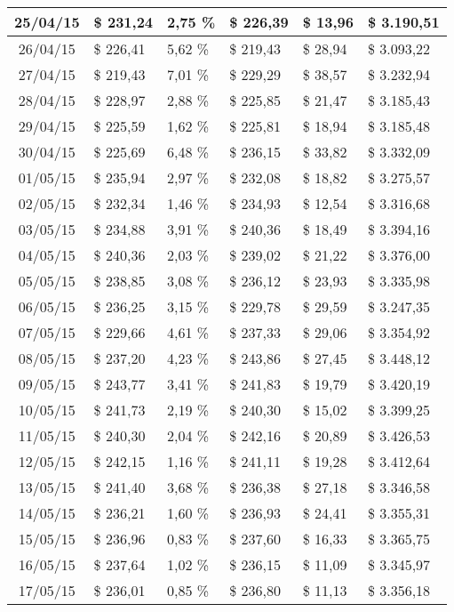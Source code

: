 \begin{small}
\begin{longtable}{|c|l|l|l|l|l|}
25/04/15 & \$ 231,24 & 2,75 \% & \$ 226,39 & \$ 13,96 & \$ 3.190,51 \\ \hline
26/04/15 & \$ 226,41 & 5,62 \% & \$ 219,43 & \$ 28,94 & \$ 3.093,22 \\ \hline
27/04/15 & \$ 219,43 & 7,01 \% & \$ 229,29 & \$ 38,57 & \$ 3.232,94 \\ \hline
28/04/15 & \$ 228,97 & 2,88 \% & \$ 225,85 & \$ 21,47 & \$ 3.185,43 \\ \hline
29/04/15 & \$ 225,59 & 1,62 \% & \$ 225,81 & \$ 18,94 & \$ 3.185,48 \\ \hline
30/04/15 & \$ 225,69 & 6,48 \% & \$ 236,15 & \$ 33,82 & \$ 3.332,09 \\ \hline
01/05/15 & \$ 235,94 & 2,97 \% & \$ 232,08 & \$ 18,82 & \$ 3.275,57 \\ \hline
02/05/15 & \$ 232,34 & 1,46 \% & \$ 234,93 & \$ 12,54 & \$ 3.316,68 \\ \hline
03/05/15 & \$ 234,88 & 3,91 \% & \$ 240,36 & \$ 18,49 & \$ 3.394,16 \\ \hline
04/05/15 & \$ 240,36 & 2,03 \% & \$ 239,02 & \$ 21,22 & \$ 3.376,00 \\ \hline
05/05/15 & \$ 238,85 & 3,08 \% & \$ 236,12 & \$ 23,93 & \$ 3.335,98 \\ \hline
06/05/15 & \$ 236,25 & 3,15 \% & \$ 229,78 & \$ 29,59 & \$ 3.247,35 \\ \hline
07/05/15 & \$ 229,66 & 4,61 \% & \$ 237,33 & \$ 29,06 & \$ 3.354,92 \\ \hline
08/05/15 & \$ 237,20 & 4,23 \% & \$ 243,86 & \$ 27,45 & \$ 3.448,12 \\ \hline
09/05/15 & \$ 243,77 & 3,41 \% & \$ 241,83 & \$ 19,79 & \$ 3.420,19 \\ \hline
10/05/15 & \$ 241,73 & 2,19 \% & \$ 240,30 & \$ 15,02 & \$ 3.399,25 \\ \hline
11/05/15 & \$ 240,30 & 2,04 \% & \$ 242,16 & \$ 20,89 & \$ 3.426,53 \\ \hline
12/05/15 & \$ 242,15 & 1,16 \% & \$ 241,11 & \$ 19,28 & \$ 3.412,64 \\ \hline
13/05/15 & \$ 241,40 & 3,68 \% & \$ 236,38 & \$ 27,18 & \$ 3.346,58 \\ \hline
14/05/15 & \$ 236,21 & 1,60 \% & \$ 236,93 & \$ 24,41 & \$ 3.355,31 \\ \hline
15/05/15 & \$ 236,96 & 0,83 \% & \$ 237,60 & \$ 16,33 & \$ 3.365,75 \\ \hline
16/05/15 & \$ 237,64 & 1,02 \% & \$ 236,15 & \$ 11,09 & \$ 3.345,97 \\ \hline
17/05/15 & \$ 236,01 & 0,85 \% & \$ 236,80 & \$ 11,13 & \$ 3.356,18 \\ \hline

\end{longtable}
\end{small}
